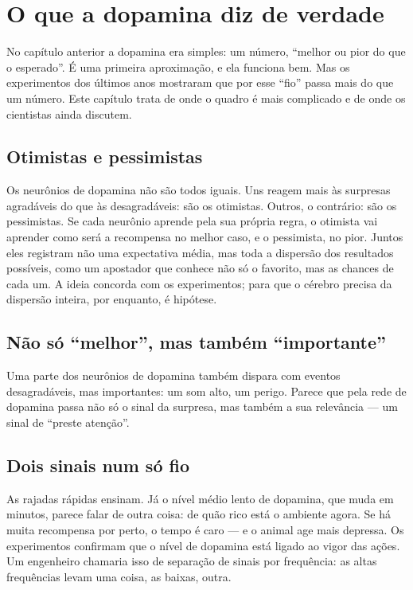\chapter{O que a dopamina diz de verdade}

No capítulo anterior a dopamina era simples: um número, ``melhor ou pior do que o esperado''. É uma primeira aproximação, e ela funciona bem. Mas os experimentos dos últimos anos mostraram que por esse ``fio'' passa mais do que um número. Este capítulo trata de onde o quadro é mais complicado e de onde os cientistas ainda discutem.

\section*{Otimistas e pessimistas}

Os neurônios de dopamina não são todos iguais. Uns reagem mais às surpresas agradáveis do que às desagradáveis: são os otimistas. Outros, o contrário: são os pessimistas. Se cada neurônio aprende pela sua própria regra, o otimista vai aprender como será a recompensa no melhor caso, e o pessimista, no pior. Juntos eles registram não uma expectativa média, mas toda a dispersão dos resultados possíveis, como um apostador que conhece não só o favorito, mas as chances de cada um. A ideia concorda com os experimentos; para que o cérebro precisa da dispersão inteira, por enquanto, é hipótese.


\section*{Não só ``melhor'', mas também ``importante''}

Uma parte dos neurônios de dopamina também dispara com eventos desagradáveis, mas importantes: um som alto, um perigo. Parece que pela rede de dopamina passa não só o sinal da surpresa, mas também a sua relevância --- um sinal de ``preste atenção''.

\section*{Dois sinais num só fio}

As rajadas rápidas ensinam. Já o nível médio lento de dopamina, que muda em minutos, parece falar de outra coisa: de quão rico está o ambiente agora. Se há muita recompensa por perto, o tempo é caro --- e o animal age mais depressa. Os experimentos confirmam que o nível de dopamina está ligado ao vigor das ações. Um engenheiro chamaria isso de separação de sinais por frequência: as altas frequências levam uma coisa, as baixas, outra.

